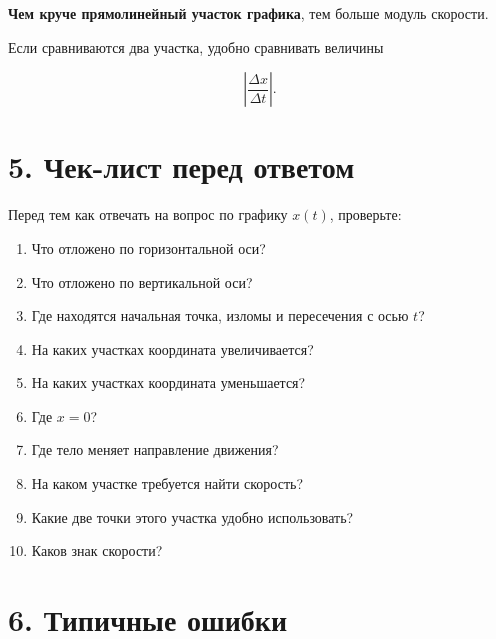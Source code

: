 \documentclass[a4paper,12pt]{article}
\newcommand{\important}[1]{\textbf{\color{accent}#1}}
\begin{document}
\important{Чем круче прямолинейный участок графика}, тем больше модуль скорости.

Если сравниваются два участка, удобно сравнивать величины

\[
\left|\frac{\Delta x}{\Delta t}\right|.
\]

\section{5. Чек-лист перед ответом}

Перед тем как отвечать на вопрос по графику \(x(t)\), проверьте:

\begin{enumerate}
  \item Что отложено по горизонтальной оси?
  \item Что отложено по вертикальной оси?
  \item Где находятся начальная точка, изломы и пересечения с осью \(t\)?
  \item На каких участках координата увеличивается?
  \item На каких участках координата уменьшается?
  \item Где \(x=0\)?
  \item Где тело меняет направление движения?
  \item На каком участке требуется найти скорость?
  \item Какие две точки этого участка удобно использовать?
  \item Каков знак скорости?
\end{enumerate}

\section{6. Типичные ошибки}
\end{document}
